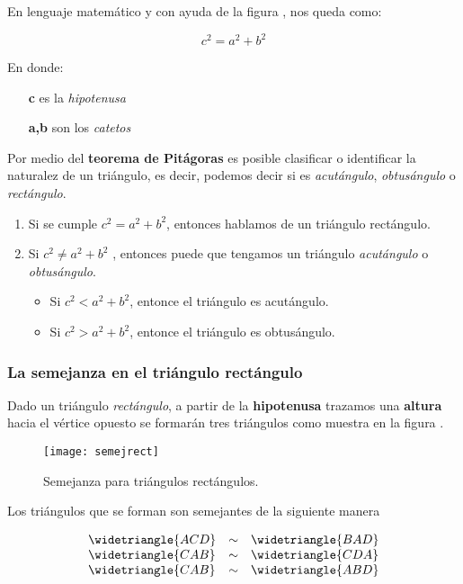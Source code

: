 En lenguaje matemático y con ayuda de la figura , nos queda
como:

\[\boxed{c^2 = a^2 + b^2}\]

En donde: 
\begin{itemize}
	\item [\textbf{c}] es la \textit{hipotenusa} 
	\item [\textbf{a,b}] son los \textit{catetos}
\end{itemize}

Por medio del \textbf{teorema de Pitágoras} es posible clasificar o identificar
la naturalez de un triángulo, es decir, podemos decir si es \textit{acutángulo},
\textit{obtusángulo} o \textit{rectángulo}. 

\begin{enumerate}
	\item Si se cumple $c^2 = a^2 + b^2$, entonces hablamos de un triángulo 
		rectángulo.
	\item Si $c^2 \ne a^2 + b^2$ , 
		entonces puede que tengamos un triángulo \textit{acutángulo} o 
		\textit{obtusángulo}.
		\begin{itemize}
			\item Si $c^2 < a^2 + b^2$, entonce el triángulo es acutángulo.
			\item Si $c^2 > a^2 + b^2$, entonce el triángulo es obtusángulo.
		\end{itemize}
\end{enumerate}


\subsubsection{La semejanza en el triángulo rectángulo}

Dado un triángulo \textit{rectángulo}, a partir de la \textbf{hipotenusa} 
trazamos una \textbf{altura} hacia el vértice opuesto se formarán tres 
triángulos como muestra en la figura .

\begin{figure}[ht!]
	\texttt{[image: semejrect]}
	\caption[semejrect]{Semejanza para triángulos rectángulos.}
\end{figure}

Los triángulos que se forman son semejantes de la siguiente manera

\begin{equation*}
\begin{array}{lcl}
	\widetriangle{ACD} & \sim & \widetriangle{BAD} \\
	\widetriangle{CAB} & \sim & \widetriangle{CDA} \\
	\widetriangle{CAB} & \sim & \widetriangle{ABD}
\end{array}
\end{equation*}

